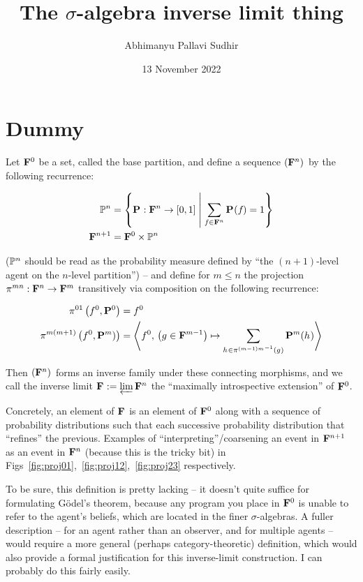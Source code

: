 \documentclass{article}
\title{The $\sigma$-algebra inverse limit thing}
\author{Abhimanyu Pallavi Sudhir}
\date{13 November 2022}
\begin{document}
\maketitle

\section{Dummy}

\begin{definition}\label{def:introspection}

Let $\EVENT^0$ be a set, called the base partition, and define a sequence $\seq{\EVENT^n}$ by the following recurrence:

\begin{align*}
    \PROBS^{n} &= \set{\PROB : \EVENT^{n} \to [0, 1] \con \sum_{\event\in\EVENT^n}\PROB(\event)=1} \\
    \EVENT^{n+1} &= \EVENT^0 \times \PROBS^{n}
\end{align*}

($\PROBS^{n}$ should be read as the probability measure defined by ``the $(n+1)$-level agent on the $n$-level partition'') -- and define for $m\le n$ the projection $\proj^{mn}:\EVENT^n\to\EVENT^m$ transitively via composition on the following recurrence:

\begin{align*}
    \proj^{01}\bra{\event^0, \PROB^0} &= \event^0 \\
    \proj^{m(m+1)}\bra{\event^0, \PROB^m)} &= \tup{\event^0 \com 
    \function{\eventG}{\EVENT^{m-1}}{\sum_{\eventH\in\inv{\proj^{(m-1)m}}\left(\eventG\right)}{\PROB^m(\eventH)}}}
\end{align*}

Then $\seq{\EVENT^n}$ forms an inverse family under these connecting morphisms, and we call the inverse limit $\EVENT := \varprojlim \EVENT^n$ the ``maximally introspective extension'' of $\EVENT^0$.

\end{definition}

Concretely, an element of $\EVENT$ is an element of $\EVENT^0$ along with a sequence of probability distributions such that each successive probability distribution that ``refines'' the previous. Examples of ``interpreting''/coarsening an event in $\EVENT^{n+1}$ as an event in $\EVENT^n$ (because this is the tricky bit) in Figs~\ref{fig:proj01},~\ref{fig:proj12},~\ref{fig:proj23} respectively.

To be sure, this definition is pretty lacking -- it doesn't quite suffice for formulating G\"odel's theorem, because any program you place in $\EVENT^0$ is unable to refer to the agent's beliefs, which are located in the finer $\sigma$-algebras. A fuller description -- for an agent rather than an observer, and for multiple agents -- would require a more general (perhaps category-theoretic) definition, which would also provide a formal justification for this inverse-limit construction. I can probably do this fairly easily.
\end{document}
